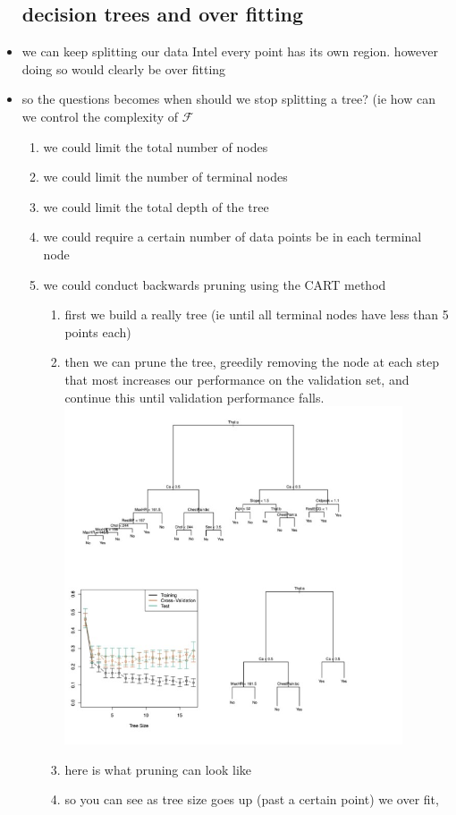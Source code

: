 \documentclass{article}
\begin{document}
\begin{itemize}
\subsection*{decision trees and over fitting}
\item we can keep splitting our data Intel every point has its own region. however doing so would clearly be over fitting
\item so the questions becomes when should we stop splitting a tree? (ie how can we control the complexity of $\mathcal{F}$
\begin{enumerate}
    \item we could limit the total number of nodes
    \item we could limit the number of terminal nodes
    \item we could limit the total depth of the tree 
    \item we could require a certain number of data points be in each terminal node
    \item we could conduct backwards pruning using the CART method 
    \begin{enumerate}
        \item first we build a really tree (ie until all terminal nodes have less than 5 points each)
        \item then we can prune the tree, greedily removing the node at each step that most increases our performance on the validation set, and continue this until validation performance falls.
        \includegraphics[width=10cm]{lecture_notes/lecture_9/immages/l9_3.jpg}
        \item here is what pruning can look like 
        \item so you can see as tree size goes up (past a certain point) we over fit,
    \end{enumerate}
\end{enumerate}

\end{itemize}
\end{document}
